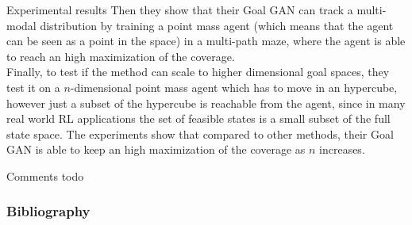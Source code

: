 \documentclass{beamer}
\begin{document}
	
	\begin{frame}{Experimental results}
		Then they show that their Goal GAN can track a multi-modal distribution by training a point mass agent (which means that the agent can be seen as a point in the space) in a multi-path maze, where the agent is able to reach an high maximization of the coverage.\\
		Finally, to test if the method can scale to higher dimensional goal spaces, they test it on a $n$-dimensional point mass agent which has to move in an hypercube, however just a subset of the hypercube is reachable from the agent, since in many real world RL applications the set of feasible states is a small subset of the full state space. The experiments show that compared to other methods, their Goal GAN is able to keep an high maximization of the coverage as $n$ increases. 
	\end{frame}


	\begin{frame}{Comments}
		todo
	\end{frame}
	
	
	\begin{frame}
		\frametitle{Bibliography}
		\footnotesize
		\nocite{florensa2018automatic}
		\nocite{mao2017least}
		\nocite{duan2016benchmarking}
		
		
	\end{frame}
	
	
\end{document}
